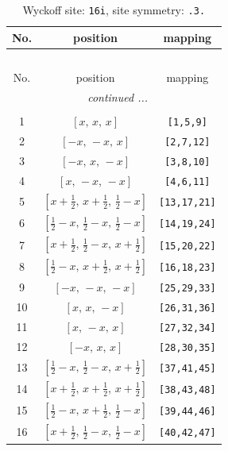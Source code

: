 \documentclass[fleqn,8pt]{jsarticle}
\begin{document}
\begin{longtable}{ccc}
\caption{Wyckoff site: {\tt 16i}, site symmetry: {\tt .3.}}
 \\
 \hline \hline
No. & position & mapping \\ \hline \endfirsthead

\multicolumn{2}{l}{\tablename\ \thetable{}} \\
 \hline \hline
No. & position & mapping \\ \hline \endhead

 \hline \hline
\multicolumn{2}{r}{\footnotesize\it continued ...} \\ \endfoot

 \hline \hline
\multicolumn{2}{r}{} \\ \endlastfoot

1 & $\left[ x,\, x,\, x \right]$ & {\tt [1,5,9]} \\ \hline
2 & $\left[ - x,\, - x,\, x \right]$ & {\tt [2,7,12]} \\ \hline
3 & $\left[ - x,\, x,\, - x \right]$ & {\tt [3,8,10]} \\ \hline
4 & $\left[ x,\, - x,\, - x \right]$ & {\tt [4,6,11]} \\ \hline
5 & $\left[ x + \frac{1}{2},\, x + \frac{1}{2},\, \frac{1}{2} - x \right]$ & {\tt [13,17,21]} \\ \hline
6 & $\left[ \frac{1}{2} - x,\, \frac{1}{2} - x,\, \frac{1}{2} - x \right]$ & {\tt [14,19,24]} \\ \hline
7 & $\left[ x + \frac{1}{2},\, \frac{1}{2} - x,\, x + \frac{1}{2} \right]$ & {\tt [15,20,22]} \\ \hline
8 & $\left[ \frac{1}{2} - x,\, x + \frac{1}{2},\, x + \frac{1}{2} \right]$ & {\tt [16,18,23]} \\ \hline
9 & $\left[ - x,\, - x,\, - x \right]$ & {\tt [25,29,33]} \\ \hline
10 & $\left[ x,\, x,\, - x \right]$ & {\tt [26,31,36]} \\ \hline
11 & $\left[ x,\, - x,\, x \right]$ & {\tt [27,32,34]} \\ \hline
12 & $\left[ - x,\, x,\, x \right]$ & {\tt [28,30,35]} \\ \hline
13 & $\left[ \frac{1}{2} - x,\, \frac{1}{2} - x,\, x + \frac{1}{2} \right]$ & {\tt [37,41,45]} \\ \hline
14 & $\left[ x + \frac{1}{2},\, x + \frac{1}{2},\, x + \frac{1}{2} \right]$ & {\tt [38,43,48]} \\ \hline
15 & $\left[ \frac{1}{2} - x,\, x + \frac{1}{2},\, \frac{1}{2} - x \right]$ & {\tt [39,44,46]} \\ \hline
16 & $\left[ x + \frac{1}{2},\, \frac{1}{2} - x,\, \frac{1}{2} - x \right]$ & {\tt [40,42,47]} \\
\end{longtable}
\end{document}
